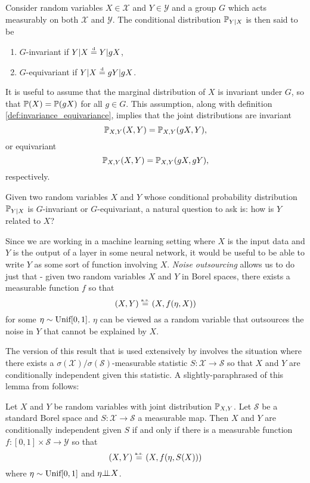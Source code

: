 \begin{definition} \label{def:invariance_equivariance}
Consider random variables $X \in \mathcal{X}$ and $Y \in \mathcal{Y}$ and a group $G$ which acts measurably on both $\mathcal{X}$ and $\mathcal{Y}$.
The conditional distribution $\mathbb{P}_{Y|X}$ is then said to be
\begin{enumerate} 
	\item $G$-invariant if $Y|X \stackrel{\text{\rm\tiny d}}{=} Y| gX$,
	\item $G$-equivariant if $Y|X \stackrel{\text{\rm\tiny d}}{=} gY | gX$.
\end{enumerate}
\end{definition}
It is useful to assume that the marginal distribution of $X$ is invariant under $G$, so that $\mathbb{P}(X) = \mathbb{P}(gX)$ for all $g \in G$.
This assumption, along with definition \ref{def:invariance_equivariance}, implies that the joint distributions are invariant
$$
	\mathbb{P}_{X,Y}(X,Y) = \mathbb{P}_{X,Y}(g X, Y),
$$
or equivariant
$$
	\mathbb{P}_{X,Y}(X,Y) = \mathbb{P}_{X,Y}(g X, g Y),
$$
respectively.

Given two random variables $X$ and $Y$ whose conditional probability distribution $\mathbb{P}_{Y|X}$ is $G$-invariant or $G$-equivariant, a natural question to ask is: how is $Y$ related to $X$?


Since we are working in a machine learning setting where $X$ is the input data and $Y$ is the output of a layer in some neural network, it would be useful to be able to write $Y$ as some sort of function involving $X$.
\textit{Noise outsourcing} allows us to do just that - given two random variables $X$ and $Y$ in Borel spaces, there exists a measurable function $f$ so that
$$
	(X,Y) \stackrel{\text{\rm\tiny a.s.}}{=} (X,f(\eta,X))
$$
for some $\eta \sim \text{\rm Unif}[0,1]$.
$\eta$ can be viewed as a random variable that outsources the noise in $Y$ that cannot be explained by $X$.

The version of this result that is used extensively by \cite{bloemreddy2019probabilistic} involves the situation where there exists a $\sigma(\mathcal{X})/\sigma(\mathcal{S})$-measurable statistic $S: \mathcal{X} \to \mathcal{S}$ so that $X$ and $Y$ are conditionally independent given this statistic.
A slightly-paraphrased of this lemma from \cite{bloemreddy2019probabilistic} follows:
\begin{lemma}
	Let $X$ and $Y$ be random variables with joint distribution $\mathbb{P}_{X,Y}$.
	Let $\mathcal{S}$ be a standard Borel space and $S: \mathcal{X} \to \mathcal{S}$ a measurable map.
	Then $X$ and $Y$ are conditionally independent given $S$ if and only if there is a measurable function $f: [0,1] \times \mathcal{S} \to \mathcal{Y}$ so that
	$$
		(X,Y) \stackrel{\text{\rm\tiny a.s.}}{=} (X,f(\eta,S(X)))
	$$
	where $\eta \sim \text{\rm Unif}[0,1]$ and $\eta {\perp\!\!\!\perp} X$.
\end{lemma}

